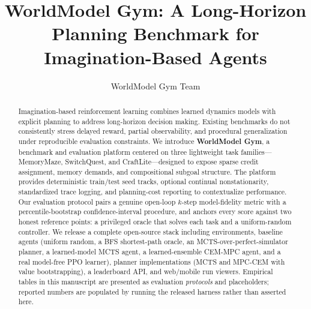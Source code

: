 \documentclass[11pt]{article}
\title{WorldModel Gym: A Long-Horizon Planning Benchmark for Imagination-Based Agents}
\author{WorldModel Gym Team}
\date{}
\begin{document}
\maketitle

\begin{abstract}
Imagination-based reinforcement learning combines learned dynamics models with explicit planning to address long-horizon decision making. Existing benchmarks do not consistently stress delayed reward, partial observability, and procedural generalization under reproducible evaluation constraints. We introduce \textbf{WorldModel Gym}, a benchmark and evaluation platform centered on three lightweight task families---MemoryMaze, SwitchQuest, and CraftLite---designed to expose sparse credit assignment, memory demands, and compositional subgoal structure. The platform provides deterministic train/test seed tracks, optional continual nonstationarity, standardized trace logging, and planning-cost reporting to contextualize performance. Our evaluation protocol pairs a genuine open-loop $k$-step model-fidelity metric with a percentile-bootstrap confidence-interval procedure, and anchors every score against two honest reference points: a privileged oracle that solves each task and a uniform-random controller. We release a complete open-source stack including environments, baseline agents (uniform random, a BFS shortest-path oracle, an MCTS-over-perfect-simulator planner, a learned-model MCTS agent, a learned-ensemble CEM-MPC agent, and a real model-free PPO learner), planner implementations (MCTS and MPC-CEM with value bootstrapping), a leaderboard API, and web/mobile run viewers. Empirical tables in this manuscript are presented as evaluation \emph{protocols} and placeholders; reported numbers are populated by running the released harness rather than asserted here.
\end{abstract}
\end{document}
